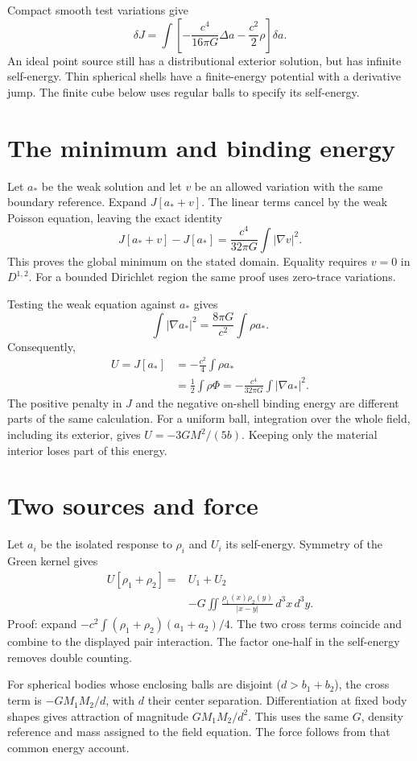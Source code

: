 \documentclass[10pt,twocolumn,letterpaper]{article}
\begin{document}
Compact smooth test variations give
\[
\delta J=\int\left[-\frac{c^4}{16\pi G}\Delta a-\frac{c^2}{2}\rho\right]\delta a.
\]
An ideal point source still has a distributional exterior solution, but has infinite self-energy. Thin spherical shells have a finite-energy potential with a derivative jump. The finite cube below uses regular balls to specify its self-energy.

\section{The minimum and binding energy}
Let $a_*$ be the weak solution and let $v$ be an allowed variation with the same boundary reference. Expand $J[a_*+v]$. The linear terms cancel by the weak Poisson equation, leaving the exact identity
\[
J[a_*+v]-J[a_*]=\frac{c^4}{32\pi G}\int|\nabla v|^2.
\]
This proves the global minimum on the stated domain. Equality requires $v=0$ in $D^{1,2}$. For a bounded Dirichlet region the same proof uses zero-trace variations.

Testing the weak equation against $a_*$ gives
\[
\int|\nabla a_*|^2=\frac{8\pi G}{c^2}\int\rho a_*.
\]
Consequently,
\[
\begin{aligned}
U=J[a_*]&=-\frac{c^2}{4}\int\rho a_*\\
&=\frac12\int\rho\Phi=-\frac{c^4}{32\pi G}\int|\nabla a_*|^2.
\end{aligned}
\]
The positive penalty in $J$ and the negative on-shell binding energy are different parts of the same calculation. For a uniform ball, integration over the whole field, including its exterior, gives $U=-3GM^2/(5b)$. Keeping only the material interior loses part of this energy.

\section{Two sources and force}
Let $a_i$ be the isolated response to $\rho_i$ and $U_i$ its self-energy. Symmetry of the Green kernel gives
\[
\begin{aligned}
U[\rho_1+\rho_2]={}&U_1+U_2\\
&-G\iint\frac{\rho_1(x)\rho_2(y)}{|x-y|}\,d^3x\,d^3y.
\end{aligned}
\]
Proof: expand $-c^2\int(\rho_1+\rho_2)(a_1+a_2)/4$. The two cross terms coincide and combine to the displayed pair interaction. The factor one-half in the self-energy removes double counting.

For spherical bodies whose enclosing balls are disjoint ($d>b_1+b_2$), the cross term is $-GM_1M_2/d$, with $d$ their center separation. Differentiation at fixed body shapes gives attraction of magnitude $GM_1M_2/d^2$. This uses the same $G$, density reference and mass assigned to the field equation. The force follows from that common energy account.
\end{document}
